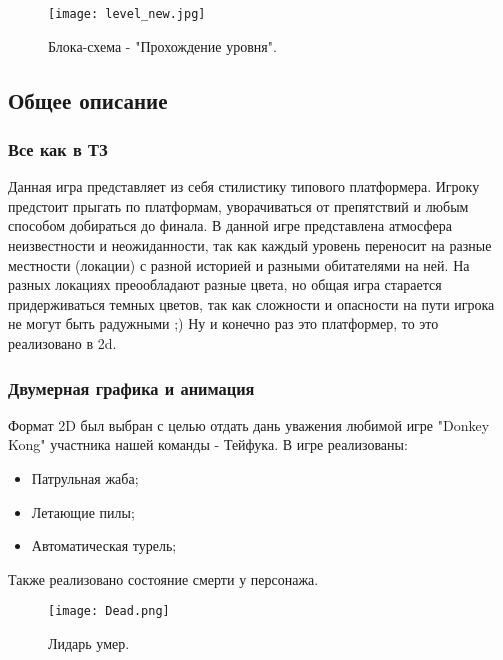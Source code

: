 \documentclass[a4paper,12pt]{article}
\begin{document}
    \begin{figure}[H] %
    \centering
    \texttt{[image: level\_new.jpg]} %
    \caption{Блока-схема - "Прохождение уровня".}
    \label{fig:player_character}
    \end{figure}

\subsection{Общее описание}


\subsubsection{Все как в ТЗ}

Данная игра представляет из себя стилистику типового платформера. Игроку предстоит прыгать по платформам, уворачиваться от препятствий и любым способом добираться до финала. В данной игре представлена атмосфера неизвестности и неожиданности, так как каждый уровень переносит на разные местности (локации) с разной историей и разными обитателями на ней. На разных локациях преообладают разные цвета, но общая игра старается придерживаться темных цветов, так как сложности и опасности на пути игрока не могут быть радужными ;) Ну и конечно раз это платформер, то это реализовано в 2d. 

\subsubsection{Двумерная графика и анимация}

Формат 2D был выбран с целью отдать дань уважения любимой игре "Donkey Kong" участника нашей команды - Тейфука. 
В игре реализованы:
\begin{itemize}
    \item Патрульная жаба;
    \item Летающие пилы;
    \item Автоматическая турель;
\end{itemize}
Также реализовано состояние смерти у персонажа.
\begin{figure}[H] %
    \centering
    \texttt{[image: Dead.png]} %
    \caption{Лидарь умер.}
    \label{fig:player_character}
\end{figure}
\end{document}
